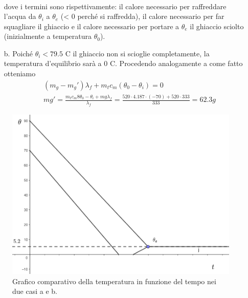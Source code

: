 \documentclass[
10pt, %
a4paper, %
oneside, %
headinclude,footinclude, %
BCOR5mm, %
]{scrartcl}
\begin{document}
\begin{exercise}
\begin{itemize}
\begin{align*}
		\end{align*} 
		dove i termini sono rispettivamente: il calore necessario per raffreddare l'acqua da $\theta_i$ a $\theta_e$ (< 0 perché si raffredda), il calore necessario per far squagliare il ghiaccio e il calore necessario per portare a $\theta_e$ il ghiaccio sciolto (inizialmente a temperatura $\theta_0$).
		\item[b.] Poiché $\theta_i<79.5$ \textdegree C il ghiaccio non si scioglie completamente, la temperatura d'equilibrio sarà a 0 \textdegree C. Procedendo analogamente a come fatto otteniamo
		\begin{align*} 
			&(m_g-m_g') \lambda_f +m_t c_m (\theta_0-\theta_i) = 0\\
			&mg' = \frac{m_t c_m 8\theta_0-\theta_i+mg\lambda_f}{\lambda_f} = \frac{520\cdot 4.187 \cdot(-70)+520\cdot 333}{333} = 62.3 g
		\end{align*} 
	\end{itemize}
	\begin{figure}[h!]
		\centering
		\includegraphics[width=0.6\linewidth]{../images/te_ghiaccio}
		\caption{Grafico comparativo della temperatura in funzione del tempo nei due casi a e b.}
		\label{fig:teghiaccio}
	\end{figure}
	\FloatBarrier
\end{exercise}
\end{document}
